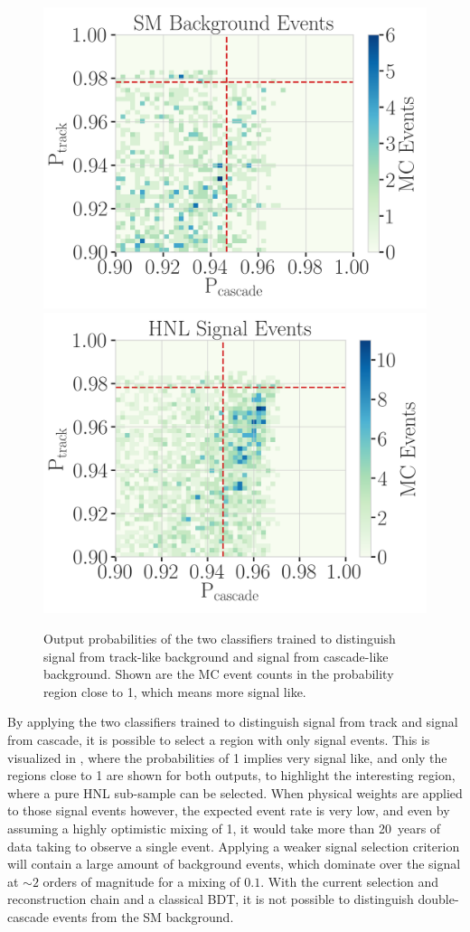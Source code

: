 \begin{figure}[h]
	\centering
    \includegraphics[width=0.49\linewidth]{figures/results/190607/classification/cascade_vs_track_class_prob_background_full_stats.png}
    \includegraphics[width=0.49\linewidth]{figures/results/190607/classification/cascade_vs_track_class_prob_hnl_full_stats.png}
    \caption[Double-cascade classifier probabilities]{Output probabilities of the two classifiers trained to distinguish signal from track-like background and signal from cascade-like background. Shown are the MC event counts in the probability region close to 1, which means more signal like.}
\end{figure}

By applying the two classifiers trained to distinguish signal from track and signal from cascade, it is possible to select a region with only signal events. This is visualized in , where the probabilities of 1 implies very signal like, and only the regions close to 1 are shown for both outputs, to highlight the interesting region, where a pure HNL sub-sample can be selected. When physical weights are applied to those signal events however, the expected event rate is very low, and even by assuming a highly optimistic mixing of 1, it would take more than \SI{20}{years} of data taking to observe a single event. Applying a weaker signal selection criterion will contain a large amount of background events, which dominate over the signal at $\sim2$ orders of magnitude for a mixing of $0.1$. With the current selection and reconstruction chain and a classical BDT, it is not possible to distinguish double-cascade events from the SM background.


